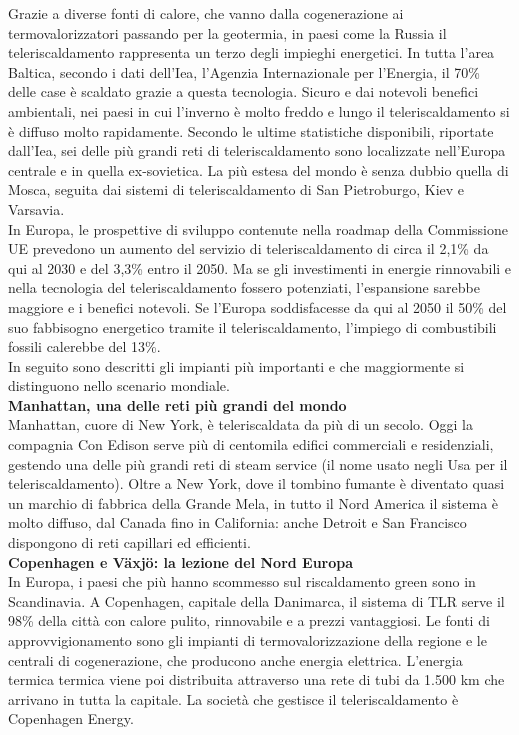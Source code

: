 \documentclass[laurea,oneside,11pt]{USiena_tesiLM}
\begin{document}
Grazie a diverse fonti di calore, che vanno dalla cogenerazione ai termovalorizzatori passando per la geotermia, in paesi come la Russia il teleriscaldamento rappresenta un terzo degli impieghi energetici. In tutta l'area Baltica, secondo i dati dell'Iea, l'Agenzia Internazionale per l'Energia, il 70\% delle case è scaldato grazie a questa tecnologia. Sicuro e dai notevoli benefici ambientali, nei paesi in cui l'inverno è molto freddo e lungo il teleriscaldamento si è diffuso molto rapidamente. Secondo le ultime statistiche disponibili, riportate dall'Iea, sei delle più grandi reti di teleriscaldamento sono localizzate nell'Europa centrale e in quella ex-sovietica. La più estesa del mondo è senza dubbio quella di Mosca, seguita dai sistemi di teleriscaldamento di San Pietroburgo, Kiev e Varsavia. \\

In Europa, le prospettive di sviluppo contenute nella roadmap della Commissione UE prevedono un aumento del servizio di teleriscaldamento di circa il 2,1\% da qui al 2030 e del 3,3\% entro il 2050. Ma se gli investimenti in energie rinnovabili e nella tecnologia del teleriscaldamento fossero potenziati, l'espansione sarebbe maggiore e i benefici notevoli. Se l'Europa soddisfacesse da qui al 2050 il 50\% del suo fabbisogno energetico tramite il teleriscaldamento, l'impiego di combustibili fossili calerebbe del 13\%.\\

In seguito sono descritti gli impianti più importanti e che maggiormente si distinguono nello scenario mondiale.\\

\noindent\textbf{Manhattan, una delle reti più grandi del mondo}\\
\noindent Manhattan, cuore di New York, è teleriscaldata da più di un secolo. Oggi la compagnia Con Edison serve più di centomila edifici commerciali e residenziali, gestendo una delle più grandi reti di steam service (il nome usato negli Usa per il teleriscaldamento). Oltre a New York, dove il tombino fumante è diventato quasi un marchio di fabbrica della Grande Mela, in tutto il Nord America il sistema è molto diffuso, dal Canada fino in California: anche Detroit e San Francisco dispongono di reti capillari ed efficienti.\\

\noindent\textbf{Copenhagen e Växjö: la lezione del Nord Europa}\\
\noindent In Europa, i paesi che più hanno scommesso sul riscaldamento green sono in Scandinavia. A Copenhagen, capitale della Danimarca, il sistema di TLR serve il 98\% della città con calore pulito, rinnovabile e a prezzi vantaggiosi. Le fonti di approvvigionamento sono gli impianti di termovalorizzazione della regione e le centrali di cogenerazione, che producono anche energia elettrica. L'energia termica termica viene poi distribuita attraverso una rete di tubi da 1.500 km che arrivano in tutta la capitale. La società che gestisce il teleriscaldamento è Copenhagen Energy.
\end{document}
